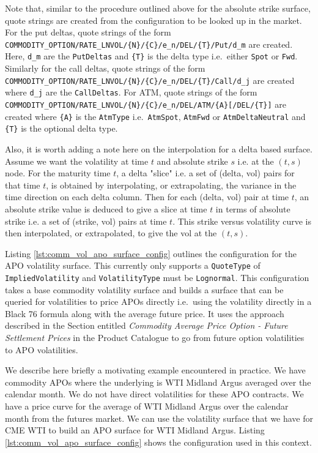 Note that, similar to the procedure outlined above for the absolute strike surface, quote strings are created from the configuration to be looked up in the market. For the put deltas, quote strings of the form \lstinline!COMMODITY_OPTION/RATE_LNVOL/{N}/{C}/e_n/DEL/{T}/Put/d_m! are created. Here, \lstinline!d_m! are the \lstinline!PutDeltas! and \lstinline!{T}! is the delta type i.e.\ either \lstinline!Spot! or \lstinline!Fwd!. Similarly for the call deltas, quote strings of the form \lstinline!COMMODITY_OPTION/RATE_LNVOL/{N}/{C}/e_n/DEL/{T}/Call/d_j! are created where \lstinline!d_j! are the \lstinline!CallDeltas!. For ATM, quote strings of the form \lstinline!COMMODITY_OPTION/RATE_LNVOL/{N}/{C}/e_n/DEL/ATM/{A}[/DEL/{T}]! are created where \lstinline!{A}! is the \lstinline!AtmType! i.e.\ \lstinline!AtmSpot!, \lstinline!AtmFwd! or \lstinline!AtmDeltaNeutral! and \lstinline!{T}! is the optional delta type.

Also, it is worth adding a note here on the interpolation for a delta based surface. Assume we want the volatility at time $t$ and absolute strike $s$ i.e. at the $(t, s)$ node. For the maturity time $t$, a delta "slice" i.e. a set of (delta, vol) pairs for that time $t$, is obtained by interpolating, or extrapolating, the variance in the time direction on each delta column. Then for each (delta, vol) pair at time $t$, an absolute strike value is deduced to give a slice at time $t$ in terms of absolute strike i.e. a set of (strike, vol) pairs at time $t$. This strike versus volatility curve is then interpolated, or extrapolated, to give the vol at the $(t, s)$.

Listing \ref{lst:comm_vol_apo_surface_config} outlines the configuration for the APO volatility surface. This currently only supports a \lstinline!QuoteType! of \lstinline!ImpliedVolatility! and \lstinline!VolatilityType! must be \lstinline!Lognormal!. This configuration takes a base commodity volatility surface and builds a surface that can be queried for volatilities to price APOs directly i.e.\ using the volatility directly in a Black 76 formula along with the average future price. It uses the approach described in the Section entitled \textit{Commodity Average Price Option - Future Settlement Prices} in the Product Catalogue to go from future option volatilities to APO volatilities.

We describe here briefly a motivating example encountered in practice. We have commodity APOs where the underlying is WTI Midland Argus averaged over the calendar month. We do not have direct volatilities for these APO contracts. We have a price curve for the average of WTI Midland Argus over the calendar month from the futures market. We can use the volatility surface that we have for CME WTI to build an APO surface for WTI Midland Argus. Listing \ref{lst:comm_vol_apo_surface_config} shows the configuration used in this context.

